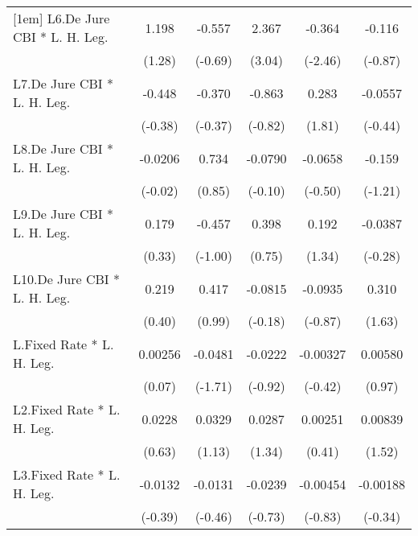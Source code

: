 {\begin{longtable}{l*{5}{c}}
[1em]
L6.De Jure CBI * L. H. Leg.&    1.198         &   -0.557         &    2.367\sym{**} &   -0.364\sym{*}  &   -0.116         \\
                &   (1.28)         &  (-0.69)         &   (3.04)         &  (-2.46)         &  (-0.87)         \\
[1em]
L7.De Jure CBI * L. H. Leg.&   -0.448         &   -0.370         &   -0.863         &    0.283         &  -0.0557         \\
                &  (-0.38)         &  (-0.37)         &  (-0.82)         &   (1.81)         &  (-0.44)         \\
[1em]
L8.De Jure CBI * L. H. Leg.&  -0.0206         &    0.734         &  -0.0790         &  -0.0658         &   -0.159         \\
                &  (-0.02)         &   (0.85)         &  (-0.10)         &  (-0.50)         &  (-1.21)         \\
[1em]
L9.De Jure CBI * L. H. Leg.&    0.179         &   -0.457         &    0.398         &    0.192         &  -0.0387         \\
                &   (0.33)         &  (-1.00)         &   (0.75)         &   (1.34)         &  (-0.28)         \\
[1em]
L10.De Jure CBI * L. H. Leg.&    0.219         &    0.417         &  -0.0815         &  -0.0935         &    0.310         \\
                &   (0.40)         &   (0.99)         &  (-0.18)         &  (-0.87)         &   (1.63)         \\
[1em]
L.Fixed Rate * L. H. Leg.&  0.00256         &  -0.0481         &  -0.0222         & -0.00327         &  0.00580         \\
                &   (0.07)         &  (-1.71)         &  (-0.92)         &  (-0.42)         &   (0.97)         \\
[1em]
L2.Fixed Rate * L. H. Leg.&   0.0228         &   0.0329         &   0.0287         &  0.00251         &  0.00839         \\
                &   (0.63)         &   (1.13)         &   (1.34)         &   (0.41)         &   (1.52)         \\
[1em]
L3.Fixed Rate * L. H. Leg.&  -0.0132         &  -0.0131         &  -0.0239         & -0.00454         & -0.00188         \\
                &  (-0.39)         &  (-0.46)         &  (-0.73)         &  (-0.83)         &  (-0.34)         \\
[1em]

\end{longtable}}
